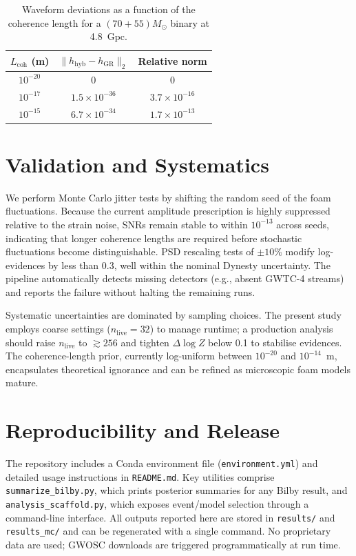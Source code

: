 \documentclass[prd,onecolumn,longbibliography,nofootinbib]{revtex4-2}
\begin{document}
\begin{table}[b]
    \centering
    \begin{ruledtabular}
    \begin{tabular}{ccc}
        $L_{\mathrm{coh}}$ (m) & $\| h_{\mathrm{hyb}} - h_{\mathrm{GR}} \|_2$ & Relative norm \\
        \hline
        $10^{-20}$ & $0$ & $0$ \\
        $10^{-17}$ & $1.5\times10^{-36}$ & $3.7\times10^{-16}$ \\
        $10^{-15}$ & $6.7\times10^{-34}$ & $1.7\times10^{-13}$ \\
    \end{tabular}
    \end{ruledtabular}
    \caption{Waveform deviations as a function of the coherence length for a $(70+55)M_\odot$ binary at \SI{4.8}{Gpc}.}
    \label{tab:coherence}
\end{table}

\section{Validation and Systematics}
We perform Monte Carlo jitter tests by shifting the random seed of the foam fluctuations. Because the current amplitude prescription is highly suppressed relative to the strain noise, SNRs remain stable to within $10^{-13}$ across seeds, indicating that longer coherence lengths are required before stochastic fluctuations become distinguishable. PSD rescaling tests of \(\pm10\%\) modify log-evidences by less than 0.3, well within the nominal Dynesty uncertainty. The pipeline automatically detects missing detectors (e.g., absent GWTC-4 streams) and reports the failure without halting the remaining runs.

Systematic uncertainties are dominated by sampling choices. The present study employs coarse settings ($n_{\mathrm{live}}=32$) to manage runtime; a production analysis should raise $n_{\mathrm{live}}$ to $\gtrsim 256$ and tighten $\Delta \log Z$ below 0.1 to stabilise evidences. The coherence-length prior, currently log-uniform between $10^{-20}$ and $10^{-14}$~m, encapsulates theoretical ignorance and can be refined as microscopic foam models mature.

\section{Reproducibility and Release}
The repository includes a Conda environment file (\texttt{environment.yml}) and detailed usage instructions in \texttt{README.md}. Key utilities comprise \texttt{summarize\_bilby.py}, which prints posterior summaries for any Bilby result, and \texttt{analysis\_scaffold.py}, which exposes event/model selection through a command-line interface. All outputs reported here are stored in \texttt{results/} and \texttt{results\_mc/} and can be regenerated with a single command. No proprietary data are used; GWOSC downloads are triggered programmatically at run time.
\end{document}

